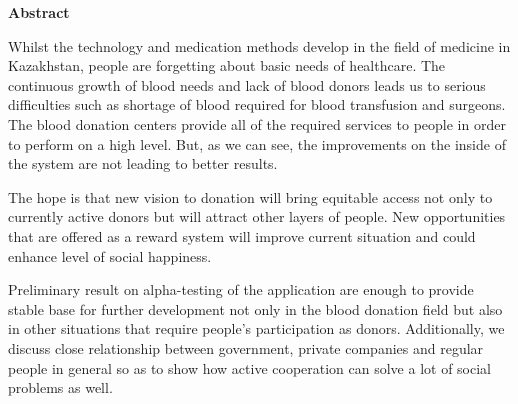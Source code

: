 \newpage
\pagestyle{plain}

\begin{center}
    \Large
    \textbf{Abstract}
    \setlength{\parindent}{15mm}
\end{center}
\par
Whilst the technology and medication methods develop in the field of medicine in Kazakhstan, people are forgetting about basic needs of healthcare. The continuous growth of blood needs and lack of blood donors leads us to serious difficulties such as shortage of blood required for blood transfusion and surgeons. The blood donation centers provide all of the required services to people in order to perform on a high level. But, as we can see, the improvements on the inside of the system are not leading to better results.
\par
The hope is that new vision to donation will bring equitable access not only to currently active donors but will attract other layers of people. New opportunities that are offered as a reward system will improve current situation and could enhance level of social happiness.
\par
Preliminary result on alpha-testing of the application are enough to provide stable base for further development not only in the blood donation field but also in other situations that require people's participation as donors. Additionally, we discuss close relationship between government, private companies and regular people in general so as to show how active cooperation can solve a lot of social problems as well.
